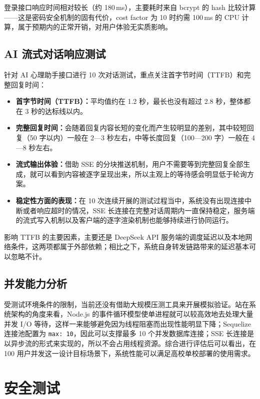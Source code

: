 登录接口响应时间相对较长（约 180\,ms），主要耗时来自 bcrypt 的 hash 比较计算——这是密码安全机制的固有代价，cost factor 为 10 时约需 100\,ms 的 CPU 计算，属于预期内的正常开销，对用户体验无实质影响。

\subsection{AI 流式对话响应测试}

针对 AI 心理助手接口进行 10 次对话测试，重点关注首字节时间（TTFB）和完整回复时间：

\begin{itemize}
    \item \textbf{首字节时间（TTFB）：}平均值约在 1.2 秒，最长也没有超过 2.8 秒，整体都在 3 秒的达标线以内。
    \item \textbf{完整回复时间：}会随着回复内容长短的变化而产生较明显的差别，其中较短回复（50 字以内）一般在 2—3 秒左右，中等长度回复（100—200 字）一般在 4—8 秒左右。
    \item \textbf{流式输出体验：}借助 SSE 的分块推送机制，用户不需要等到完整回复全部生成，就可以看到内容被逐字呈现出来，所以主观上的等待感会明显低于轮询方案。
    \item \textbf{稳定性方面的表现：}在 10 次连续开展的测试过程当中，系统没有出现连接中断或者响应超时的情况，SSE 长连接在完整对话周期内一直保持稳定，服务端的流式写入机制以及客户端的逐字渲染机制也能够持续进行协同运行。
\end{itemize}
\vspace{-0.5\baselineskip}
影响 TTFB 的主要因素，主要还是 DeepSeek API 服务端的调度延迟以及本地网络条件，这两项都属于外部依赖；相比之下，系统自身转发链路带来的延迟基本可以忽略不计。

\subsection{并发能力分析}

受测试环境条件的限制，当前还没有借助大规模压测工具来开展模拟验证。站在系统架构的角度来看，Node.js 的事件循环模型使单进程就可以较高效地去处理大量并发 I/O 等待，这样一来能够避免因为线程阻塞而出现性能明显下降；Sequelize 连接池配置为 \texttt{max: 10}，因此可以支撑最多 10 个并发数据库连接；SSE 长连接是以异步流的形式来实现的，所以不会占用线程资源。综合进行评估后可以看出，在 100 用户并发这一设计目标场景下，系统性能可以满足高校单校部署的使用需求。


\section{安全测试}

